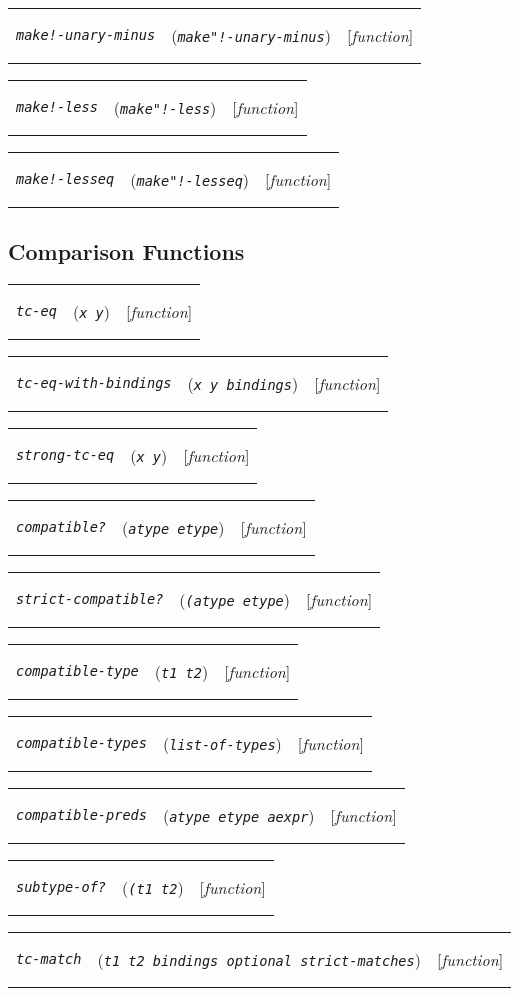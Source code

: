 \documentclass[12pt]{book}
\makeatletter
\def\ampoptional{{\smaller\sc {\smaller\smaller \&}optional\ }}
\newenvironment{function}[3]%
{\par\noindent\begin{boxedminipage}{\textwidth}%
 \par\noindent\begin{tabularx}{\linewidth}{l>{\raggedright}Xr}%
 \functionhtgt{#1}&(\texttt{\textit{#2}})&[\emph{#3}]%
 \end{tabularx}\par\flushright\begin{minipage}{.97\textwidth}}
{\end{minipage}\end{boxedminipage}}
\newcommand{\functionnm}[1]{\texttt{\textit{#1}}}
\newcommand{\functionhtgt}[1]{\hypertarget{#1}{\functionnm{#1}}\index{#1@\functionnm{#1}|underline}}
\newenvironment{lispfunction}[2]%
{\begin{function}{#1}{#2}{function}}{\end{function}}
\newenvironment{functioni}[3]%
{\par\noindent\begin{boxedminipage}{\textwidth}%
 \par\noindent\begin{tabularx}{\linewidth}{lXr}%
 \hypertarget{#1}{\functionnm{#1}}\index{#2@\functionnm{#2}|underline}%
   &(\texttt{\textit{#2}})&[\emph{function}]%
 \end{tabularx}\par}
{\end{boxedminipage}}
\makeatother
\begin{document}
\begin{functioni}{make!-unary-minus}{make"!-unary-minus}{ex}
\end{functioni}

\begin{functioni}{make!-less}{make"!-less}{ex1 ex2}
\end{functioni}

\begin{functioni}{make!-lesseq}{make"!-lesseq}{ex1 ex2}
\end{functioni}


\subsection{Comparison Functions}

\begin{lispfunction}{tc-eq}{x y}
\end{lispfunction}

\begin{lispfunction}{tc-eq-with-bindings}{x y bindings}
\end{lispfunction}

\begin{lispfunction}{strong-tc-eq}{x y}
\end{lispfunction}

\begin{lispfunction}{compatible?}{atype etype}
\end{lispfunction}

\begin{lispfunction}{strict-compatible?}{(atype etype}
\end{lispfunction}

\begin{lispfunction}{compatible-type}{t1 t2}
\end{lispfunction}

\begin{lispfunction}{compatible-types}{list-of-types}
\end{lispfunction}

\begin{lispfunction}{compatible-preds}{atype etype aexpr}
\end{lispfunction}

\begin{lispfunction}{subtype-of?}{(t1 t2}
\end{lispfunction}

\begin{lispfunction}{tc-match}{t1 t2 bindings \ampoptional strict-matches}
\end{lispfunction}
\end{document}

